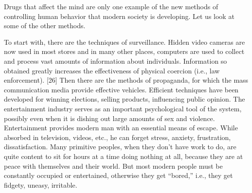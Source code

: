  Drugs that affect the mind are only one example of the new methods of controlling human behavior that modern society is developing. Let us look at some of the other methods.

 To start with, there are the techniques of surveillance. Hidden video cameras are now used in most stores and in many other places, computers are used to collect and process vast amounts of information about individuals. Information so obtained greatly increases the effectiveness of physical coercion (i.e., law enforcement). [26] Then there are the methods of propaganda, for which the mass communication media provide effective vehicles. Efficient techniques have been developed for winning elections, selling products, influencing public opinion. The entertainment industry serves as an important psychological tool of the system, possibly even when it is dishing out large amounts of sex and violence. Entertainment provides modern man with an essential means of escape. While absorbed in television, videos, etc., he can forget stress, anxiety, frustration, dissatisfaction. Many primitive peoples, when they don’t have work to do, are quite content to sit for hours at a time doing nothing at all, because they are at peace with themselves and their world. But most modern people must be constantly occupied or entertained, otherwise they get “bored,” i.e., they get fidgety, uneasy, irritable.

